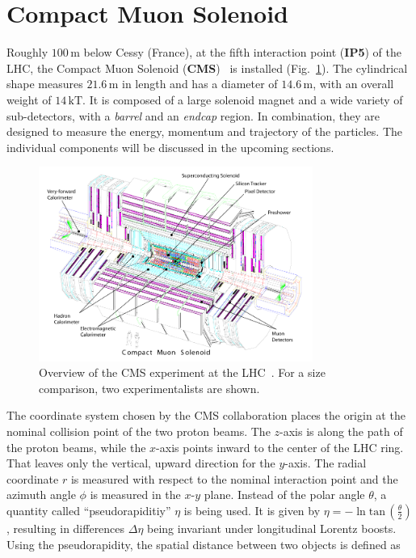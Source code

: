 \section{Compact Muon Solenoid}
\label{sec:cms}

Roughly $100\,\text{m}$ below Cessy (France), at the fifth interaction point (\textbf{IP5}) of the LHC, the Compact Muon Solenoid (\textbf{CMS})~\cite{cmsjinst} is installed (Fig.~\ref{fig:cms}). The cylindrical shape measures $21.6\,\text{m}$ in length and has a diameter of $14.6\,\text{m}$, with an overall weight of $14\,\text{kT}$. It is composed of a large solenoid magnet and a wide variety of sub-detectors, with a \textit{barrel} and an \textit{endcap} region. In combination, they are designed to measure the energy, momentum and trajectory of the particles. The individual components will be discussed in the upcoming sections.

\begin{figure}[ht!]
  \centering
  \includegraphics[width=0.8\textwidth]{plots/cms.pdf}
  \caption{Overview of the CMS experiment at the LHC~\cite{cmsjinst}. For a size comparison, two experimentalists are shown.}
  \label{fig:cms}
\end{figure}

The coordinate system chosen by the CMS collaboration places the origin at the nominal collision point of the two proton beams. The $z$-axis is along the path of the proton beams, while the $x$-axis points inward to the center of the LHC ring. That leaves only the vertical, upward direction for the $y$-axis. The radial coordinate $r$ is measured with respect to the nominal interaction point and the azimuth angle $\phi$ is measured in the $x$-$y$ plane. Instead of the polar angle $\theta$, a quantity called ``pseudorapiditiy'' $\eta$ is being used. It is given by $\eta = - \ln{\text{tan}\,\left(\frac{\theta}{2}\right)}$, resulting in differences $\Delta\eta$ being invariant under longitudinal Lorentz boosts. Using the pseudorapidity, the spatial distance between two objects is defined as

